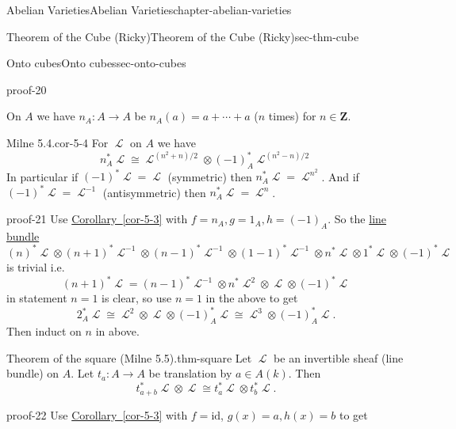 \documentclass[oneside,10pt,]{book}
\numberwithin{equation}{section}
\newcommand{\sheaf}[1]{\operatorname{\mathcal{#1}}}
\newcommand{\ZZ}{\mathbf{Z}}
\newcommand{\id}{\mathrm{id}}
\begin{document}
\begin{chapterptx}{Abelian Varieties}{}{Abelian Varieties}{}{}{chapter-abelian-varieties}
\begin{sectionptx}{Theorem of the Cube (Ricky)}{}{Theorem of the Cube (Ricky)}{}{}{sec-thm-cube}
\begin{subsectionptx}{Onto cubes}{}{Onto cubes}{}{}{sec-onto-cubes}
\begin{proofptx}{}{proof-20}
\end{proofptx}
\hypertarget{p-127}{}%
On \(A\) we have \(n_A \colon A\to A\) be \(n_A(a) = a+\cdots + a\) (\(n\) times) for \(n\in \ZZ\).%
\begin{corollary}{Milne 5.4.}{}{cor-5-4}%
\hypertarget{p-128}{}%
For \(\sheaf L\) on \(A\) we have%
\begin{equation*}
n^*_A\sheaf L \cong \sheaf L^{(n^2 + n)/2} \otimes (-1)_A^* \sheaf L^{(n^2 - n)/2}
\end{equation*}
In particular if \((-1)^* \sheaf L = \sheaf L\) (symmetric) then \(n_A^* \sheaf L = \sheaf L^{n^2}\). And if \((-1)^* \sheaf L = \sheaf L^{-1}\) (antisymmetric) then \(n_A^* \sheaf L = \sheaf L^{n}\).%
\end{corollary}
\begin{proofptx}{}{proof-21}
\hypertarget{p-129}{}%
Use \hyperref[cor-5-3]{Corollary~\ref{cor-5-3}} with \(f= n_A, g = 1_A, h = (-1)_A\). So the \hyperref[def-line-bundle]{line bundle}%
\begin{equation*}
(n)^*\sheaf L \otimes (n+1)^*\sheaf L^{-1}\otimes (n-1)^*\sheaf L^{-1}\otimes (1-1)^*\sheaf L^{-1} \otimes   n^*\sheaf L \otimes   1^*\sheaf L \otimes   (-1)^*\sheaf L
\end{equation*}
is trivial i.e.%
\begin{equation*}
(n+1)^*\sheaf L =  (n-1)^*\sheaf L^{-1}\otimes n^*\sheaf L^2 \otimes   \sheaf L \otimes   (-1)^*\sheaf L
\end{equation*}
in statement \(n = 1\) is clear, so use \(n=1\) in the above to get%
\begin{equation*}
2_A^*\sheaf L \cong \sheaf L^2 \otimes \sheaf L \otimes (-1)^*_A \sheaf L\cong \sheaf L^3 \otimes (-1)_A^*\sheaf  L\text{.}
\end{equation*}
Then induct on \(n\) in above.%
\end{proofptx}
\begin{theorem}{Theorem of the square (Milne 5.5).}{}{thm-square}%
\hypertarget{p-130}{}%
Let \(\sheaf L\) be an invertible sheaf (line bundle) on \(A\). Let \(t_a \colon A\to A\) be translation by \(a\in A(k)\). Then%
\begin{equation*}
t_{a+b}^*\sheaf L \otimes \sheaf L \cong t_a^*\sheaf L \otimes t_b^* \sheaf L\text{.}
\end{equation*}
%
\end{theorem}
\begin{proofptx}{}{proof-22}
\hypertarget{p-131}{}%
Use \hyperref[cor-5-3]{Corollary~\ref{cor-5-3}} with \(f=  \id\), \(g(x)  = a, h(x) = b\) to get%

\end{proofptx}
\end{subsectionptx}
\end{sectionptx}
\end{chapterptx}
\end{document}
